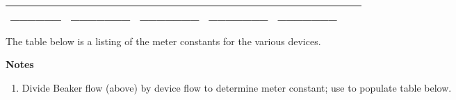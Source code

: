 \documentclass[11pt]{article}
\providecommand{\tightlist}{%
      \setlength{\itemsep}{0pt}\setlength{\parskip}{0pt}}
\begin{document}
\begin{longtable}[]{@{}llrrrrr@{}}
\begin{minipage}[t]{0.07\columnwidth}
\_\_\_\_\_\_\strut
\end{minipage} & \begin{minipage}[t]{0.07\columnwidth}\raggedleft
\_\_\_\_\_\_\_\strut
\end{minipage} & \begin{minipage}[t]{0.07\columnwidth}\raggedleft
\_\_\_\_\_\_\_\strut
\end{minipage} & \begin{minipage}[t]{0.07\columnwidth}\raggedleft
\_\_\_\_\_\_\_\strut
\end{minipage} & \begin{minipage}[t]{0.07\columnwidth}\raggedleft
\_\_\_\_\_\_\_\strut
\end{minipage}\tabularnewline
\bottomrule
\end{longtable}

The table below is a listing of the meter constants for the various
devices.

\textbf{Notes}

\begin{enumerate}
\def\labelenumi{\arabic{enumi}.}
\tightlist
\item
  Divide Beaker flow (above) by device flow to determine meter constant;
  use to populate table below.
\end{enumerate}
\end{document}
